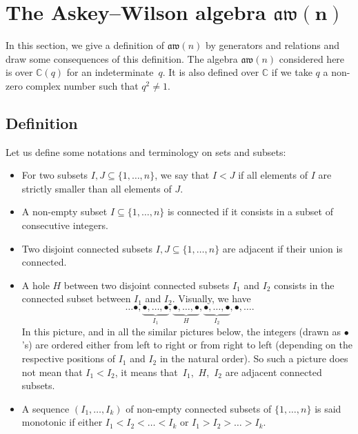 \documentclass[10pt,a4paper]{amsart}
\numberwithin{equation}{section}
\theoremstyle{definition}
\newcommand{\aw}{\mathfrak{aw}(n)}
\begin{document}


\section[The Askey--Wilson algebra aw(n)]{The Askey--Wilson algebra $\boldsymbol{\aw}$}\label{sec-def}

In this section, we give a definition of $\aw$ by generators and relations and draw some consequences of this definition.
The algebra $\aw$ considered here is over $\mathbb{C}(q)$ for an indeterminate~$q$. It is also defined over $\mathbb{C}$ if
we take $q$ a non-zero complex number such that $q^2\neq 1$.



\subsection{Definition}

Let us define some notations and terminology on sets and subsets:
\begin{itemize}\itemsep=0pt
 \item For two subsets $I,J\subseteq\{1,\dots,n\}$, we say that $I<J$ if all elements of $I$ are strictly smaller than all elements of $J$.

\item A non-empty subset $I\subseteq\{1,\dots,n\}$ is connected if it consists in a subset of consecutive integers.

\item Two disjoint connected subsets $I,J\subseteq\{1,\dots,n\}$ are adjacent if their union is connected.

\item A hole $H$ between two disjoint connected subsets $I_1$ and $I_2$ consists in the connected subset between $I_1$ and $I_2$. Visually, we have
\[\ \ \ldots \bullet,\underbrace{\bullet,\dots,\bullet}_{I_1},\underbrace{\bullet,\dots,\bullet}_{H},\underbrace{\bullet,\dots,\bullet}_{I_2},\bullet,\ldots .\]
In this picture, and in all the similar pictures below, the integers (drawn as $\bullet$'s) are ordered either from left to right or from right to left (depending on the respective positions of $I_1$ and $I_2$ in the natural order). So such a picture does not mean that $I_1<I_2$, it means that~$I_1$,~$H$,~$I_2$ are adjacent connected subsets.

\item
A sequence $(I_1,\dots,I_k)$ of non-empty connected subsets of $\{1,\dots,n\}$ is said monotonic if
either $I_1<I_2<\dots<I_k$ or $I_1>I_2>\dots>I_k$.
 \end{itemize}
\end{document}
